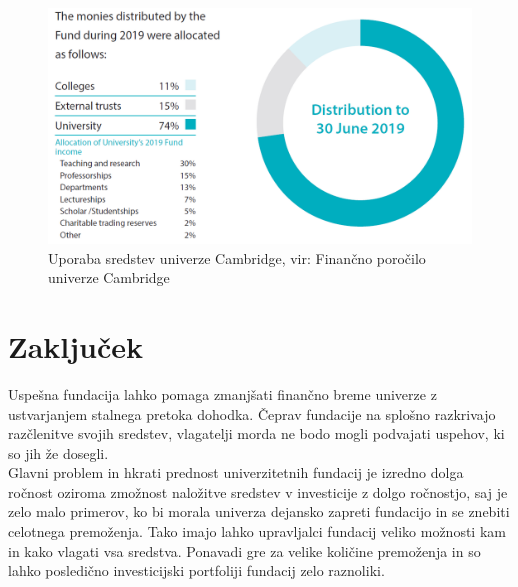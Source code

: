 \documentclass[12pt, a4paper]{article}
\begin{document}
\begin{figure}[!h]
\centering
\includegraphics[width = 14 cm]{slike/cambridge.png}
\caption{Uporaba sredstev univerze Cambridge, vir: Finančno poročilo univerze Cambridge}
\label{Slika 5}
\end{figure}


\newpage
\section[Zaključek]{Zaključek}

Uspešna fundacija lahko pomaga zmanjšati finančno breme univerze z ustvarjanjem stalnega pretoka dohodka. Čeprav fundacije na splošno razkrivajo razčlenitve svojih sredstev, vlagatelji morda ne bodo mogli podvajati uspehov, ki so jih že dosegli.\\

Glavni problem in hkrati prednost univerzitetnih fundacij je izredno dolga ročnost oziroma zmožnost naložitve sredstev v investicije z dolgo ročnostjo, saj je zelo malo primerov, ko bi morala univerza dejansko zapreti fundacijo in se znebiti celotnega premoženja. Tako imajo lahko upravljalci fundacij veliko možnosti kam in kako vlagati vsa sredstva. Ponavadi gre za velike količine premoženja in so lahko posledično investicijski portfoliji fundacij zelo raznoliki.
\end{document}

